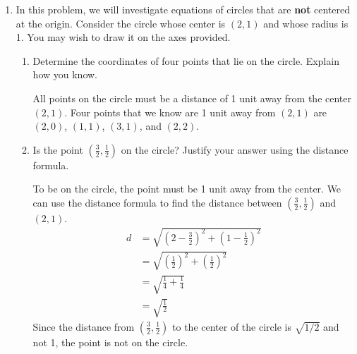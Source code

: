 \documentclass{article}
\begin{document}
\begin{enumerate}
\pspace{\newpage}

\item
\begin{problem}
In this problem, we will investigate equations of circles that are \textbf{not} centered at the origin. Consider the circle whose center is $(2, 1)$ and whose radius is 1. You may wish to draw it on the axes provided.
\end{problem}

\begin{enumerate}
    \item
    \begin{problem}
        Determine the coordinates of four points that lie on the circle. Explain how you know.
    \end{problem}
    

        \begin{solution}
        All points on the circle must be a distance of 1 unit away from the center $(2,1)$. Four points that we know are 1 unit away from $(2,1)$ are $(2,0)$, $(1,1)$, $(3,1)$, and $(2,2)$.
    \end{solution}


    \item 
    \begin{problem}
         Is the point $(\frac{3}{2},\frac{1}{2})$ on the circle? Justify your answer using the distance formula.
    \end{problem}
    \pspace{\vfill}

    \begin{solution}
        To be on the circle, the point must be 1 unit away from the center. We can use the distance formula to find the distance between $(\frac{3}{2},\frac{1}{2})$ and $(2,1)$. 
        \begin{align*}
            d &= \sqrt{(2-\tfrac{3}{2})^2 + (1-\tfrac{1}{2})^2} \\
            &= \sqrt{(\tfrac{1}{2})^2 + (\tfrac{1}{2})^2} \\
            &= \sqrt{\tfrac{1}{4}+\tfrac{1}{4}}\\
            &= \sqrt{\tfrac{1}{2}}
        \end{align*}
        Since the distance from $(\frac{3}{2},\frac{1}{2})$ to the center of the circle is $\sqrt{1/2}$ and not 1, the point is not on the circle.
    \end{solution}


\end{enumerate}
\end{enumerate}
\end{document}
